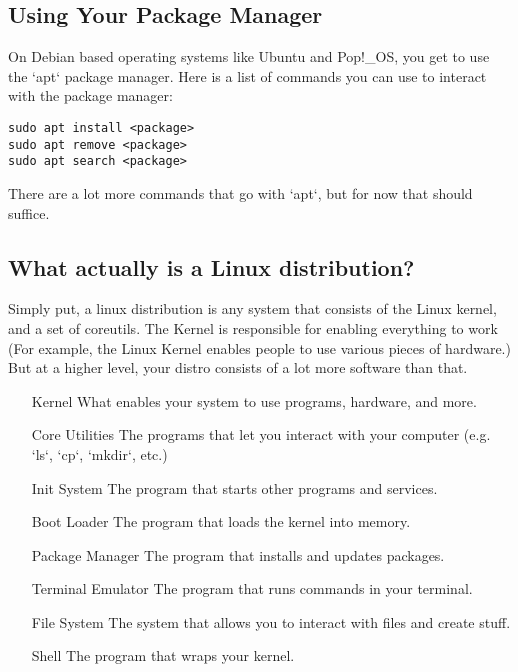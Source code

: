 \documentclass {report}
\begin{document}
\subsection{Using Your Package Manager}
On Debian based operating systems like Ubuntu and Pop!\_OS, you get to use the `apt` package manager. Here is a list of commands you can use to interact with the package manager:
\begin{lstlisting}
sudo apt install <package>
sudo apt remove <package>
sudo apt search <package>
\end{lstlisting}

There are a lot more commands that go with `apt`, but for now that should suffice.

\subsection{What actually is a Linux distribution?}
Simply put, a linux distribution is any system that consists of the Linux kernel, and a set of coreutils. The Kernel is responsible for enabling everything to work (For example, the Linux Kernel enables people to use various pieces of hardware.) But at a higher level, your distro consists of a lot more software than that.

\begin{enumerate}
  \item [Kernel] What enables your system to use programs, hardware, and more.
  \item [Core Utilities] The programs that let you interact with your computer (e.g. `ls`, `cp`, `mkdir`, etc.)
  \item [Init System] The program that starts other programs and services.
  \item [Boot Loader] The program that loads the kernel into memory.
  \item [Package Manager] The program that installs and updates packages.
  \item [Terminal Emulator] The program that runs commands in your terminal.
  \item [File System] The system that allows you to interact with files and create stuff.
  \item [Shell] The program that wraps your kernel.
\end{enumerate}
\end{document}
